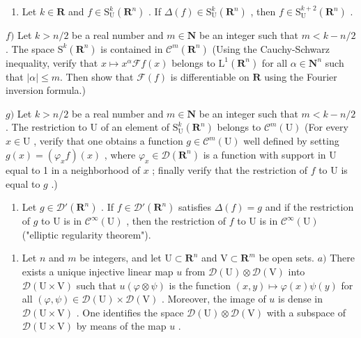 \begin{enumerate}
\def\labelenumi{\alph{enumi})}
\setcounter{enumi}{4}
\tightlist
\item
  Let \(k \in \mathbf{R}\) and \(f \in \mathrm{S}_{\mathrm{U}}^{k}(\mathbf{R}^{n})\) . If \(\Delta(f) \in \mathrm{S}_{\mathrm{U}}^{k}(\mathbf{R}^{n})\) , then \(f \in \mathrm{S}_{\mathrm{U}}^{k+2}(\mathbf{R}^{n})\) .
\end{enumerate}

\(f)\) Let \(k > n/2\) be a real number and \(m \in \mathbf{N}\) be an integer such that \(m < k - n/2\) . The space \(\mathrm{S}^k(\mathbf{R}^n)\) is contained in \(\mathcal{C}^m(\mathbf{R}^n)\) (Using the Cauchy-Schwarz inequality, verify that \(x \mapsto x^\alpha \mathscr{F} f(x)\) belongs to \(\mathrm{L}^1(\mathbf{R}^n)\) for all \(\alpha \in \mathbf{N}^n\) such that \(|\alpha| \leqslant m\). Then show that \(\mathscr{F}(f)\) is differentiable on \(\mathbf{R}\) using the Fourier inversion formula.)

\(g)\) Let \(k > n/2\) be a real number and \(m \in \mathbf{N}\) be an integer such that \(m < k - n/2\). The restriction to U of an element of \(\mathrm{S}_{\mathrm{U}}^{k}(\mathbf{R}^{n})\) belongs to \(\mathcal{C}^{m}(\mathrm{U})\) (For every \(x \in \mathrm{U}\) , verify that one obtains a function \(g \in \mathcal{C}^{m}(\mathrm{U})\) well defined by setting \(g(x) = (\varphi_{x}f)(x)\) , where \(\varphi_{x} \in \mathcal{D}(\mathbf{R}^{n})\) is a function with support in U equal to 1 in a neighborhood of \(x\) ; finally verify that the restriction of \(f\) to U is equal to \(g\) .)

\begin{enumerate}
\def\labelenumi{\alph{enumi})}
\setcounter{enumi}{7}
\tightlist
\item
  Let \(g \in \mathcal{D}'(\mathbf{R}^n)\) . If \(f \in \mathcal{D}'(\mathbf{R}^n)\) satisfies \(\Delta(f) = g\) and if the restriction of \(g\) to U is in \(\mathcal{C}^\infty(\mathrm{U})\) , then the restriction of \(f\) to U is in \(\mathcal{C}^\infty(\mathrm{U})\) ("elliptic regularity theorem").
\end{enumerate}

\begin{enumerate}
\def\labelenumi{\arabic{enumi})}
\setcounter{enumi}{27}
\tightlist
\item
  Let \(n\) and \(m\) be integers, and let \(\mathrm{U} \subset \mathbf{R}^n\) and \(\mathrm{V} \subset \mathbf{R}^m\) be open sets. \(a)\) There exists a unique injective linear map \(u\) from \(\mathcal{D}(\mathrm{U}) \otimes \mathcal{D}(\mathrm{V})\) into \(\mathcal{D}(\mathrm{U} \times \mathrm{V})\) such that \(u(\varphi \otimes \psi)\) is the function \((x, y) \mapsto \varphi(x)\psi(y)\) for all \((\varphi, \psi) \in \mathcal{D}(\mathrm{U}) \times \mathcal{D}(\mathrm{V})\) . Moreover, the image of \(u\) is dense in \(\mathcal{D}(\mathrm{U} \times \mathrm{V})\) . One identifies the space \(\mathcal{D}(\mathrm{U}) \otimes \mathcal{D}(\mathrm{V})\) with a subspace of \(\mathcal{D}(\mathrm{U} \times \mathrm{V})\) by means of the map \(u\) .
\end{enumerate}

